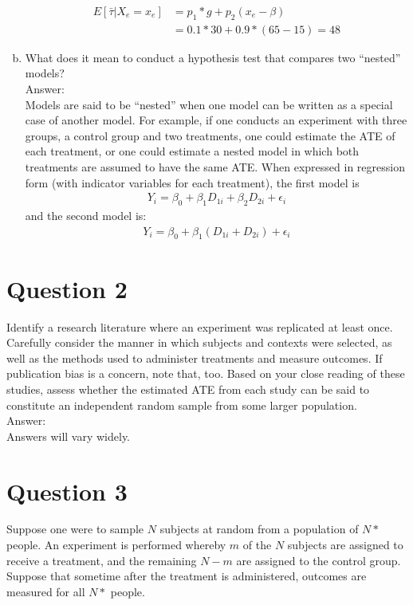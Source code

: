 \documentclass[11pt,notitlepage]{article}\usepackage[]{graphicx}\usepackage[]{color}
\begin{document}
\begin{enumerate}[a)]
\begin{align*}
E[\bar{\tau}|X_e = x_e] &= p_1*g + p_2(x_e - \beta) \\
&= 0.1 * 30 + 0.9*(65-15) = 48
\end{align*}


\item  What does it mean to conduct a hypothesis test that compares two ``nested'' models?\\
Answer:\\
Models are said to be ``nested'' when one model can be written as a special case of another model. For example, if one conducts an experiment with three groups, a control group and two treatments, one could estimate the ATE of each treatment, or one could estimate a nested model in which both treatments are assumed to have the same ATE.  When expressed in regression form (with indicator variables for each treatment), the first model is 
\begin{align*}
Y_i = \beta_0 + \beta_1 D_{1i} + \beta_2 D_{2i} + \epsilon_i
\end{align*}
and the second model is:
\begin{align*}
Y_i = \beta_0 + \beta_1 (D_{1i} + D_{2i}) + \epsilon_i
\end{align*}

\end{enumerate}


\section*{Question 2}
Identify a research literature where an experiment was replicated at least once. Carefully consider the manner in which subjects and contexts were selected, as well as the methods used to administer treatments and measure outcomes. If publication bias is a concern, note that, too. Based on your close reading of these studies, assess whether the estimated ATE from each study can be said to constitute an independent random sample from some larger population.\\
Answer:\\
Answers will vary widely.

\section*{Question 3}
Suppose one were to sample $N$ subjects at random from a population of $N*$ people. An experiment is performed whereby $m$ of the $N$ subjects are assigned to receive a treatment, and the remaining $N - m$ are assigned to the control group. Suppose that sometime after the treatment is administered, outcomes are measured for all $N*$ people.
\end{document}
